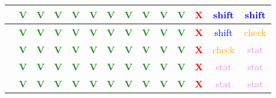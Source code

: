 \begin{frame}
{\begin{tabular}{|c||*{13}{c|}}
\hline
[283-344] & \textcolor{ForestGreen}{\textbf{V}} & \textcolor{ForestGreen}{\textbf{V}} & \textcolor{ForestGreen}{\textbf{V}} & \textcolor{ForestGreen}{\textbf{V}} & \textcolor{ForestGreen}{\textbf{V}} & \textcolor{ForestGreen}{\textbf{V}} & \textcolor{ForestGreen}{\textbf{V}} & \textcolor{ForestGreen}{\textbf{V}} & \textcolor{ForestGreen}{\textbf{V}} & \textcolor{ForestGreen}{\textbf{V}} & \textcolor{Red}{\textbf{X}} & \textcolor{blue}{shift} & \textcolor{blue}{shift} \\
\hline
[344-443] & \textcolor{ForestGreen}{\textbf{V}} & \textcolor{ForestGreen}{\textbf{V}} & \textcolor{ForestGreen}{\textbf{V}} & \textcolor{ForestGreen}{\textbf{V}} & \textcolor{ForestGreen}{\textbf{V}} & \textcolor{ForestGreen}{\textbf{V}} & \textcolor{ForestGreen}{\textbf{V}} & \textcolor{ForestGreen}{\textbf{V}} & \textcolor{ForestGreen}{\textbf{V}} & \textcolor{ForestGreen}{\textbf{V}} & \textcolor{Red}{\textbf{X}} & \textcolor{blue}{shift} & \textcolor{orange}{check} \\
\hline
[443-577] & \textcolor{ForestGreen}{\textbf{V}} & \textcolor{ForestGreen}{\textbf{V}} & \textcolor{ForestGreen}{\textbf{V}} & \textcolor{ForestGreen}{\textbf{V}} & \textcolor{ForestGreen}{\textbf{V}} & \textcolor{ForestGreen}{\textbf{V}} & \textcolor{ForestGreen}{\textbf{V}} & \textcolor{ForestGreen}{\textbf{V}} & \textcolor{ForestGreen}{\textbf{V}} & \textcolor{ForestGreen}{\textbf{V}} & \textcolor{Red}{\textbf{X}} & \textcolor{orange}{check} & \textcolor{violet}{stat} \\
\hline
[577-606] & \textcolor{ForestGreen}{\textbf{V}} & \textcolor{ForestGreen}{\textbf{V}} & \textcolor{ForestGreen}{\textbf{V}} & \textcolor{ForestGreen}{\textbf{V}} & \textcolor{ForestGreen}{\textbf{V}} & \textcolor{ForestGreen}{\textbf{V}} & \textcolor{ForestGreen}{\textbf{V}} & \textcolor{ForestGreen}{\textbf{V}} & \textcolor{ForestGreen}{\textbf{V}} & \textcolor{ForestGreen}{\textbf{V}} & \textcolor{Red}{\textbf{X}} & \textcolor{violet}{stat} & \textcolor{violet}{stat} \\
\hline
[606-1500] & \textcolor{ForestGreen}{\textbf{V}} & \textcolor{ForestGreen}{\textbf{V}} & \textcolor{ForestGreen}{\textbf{V}} & \textcolor{ForestGreen}{\textbf{V}} & \textcolor{ForestGreen}{\textbf{V}} & \textcolor{ForestGreen}{\textbf{V}} & \textcolor{ForestGreen}{\textbf{V}} & \textcolor{ForestGreen}{\textbf{V}} & \textcolor{ForestGreen}{\textbf{V}} & \textcolor{ForestGreen}{\textbf{V}} & \textcolor{Red}{\textbf{X}} & \textcolor{violet}{stat} & \textcolor{violet}{stat} \\
\hline
\end{tabular}
}
\end{frame}
